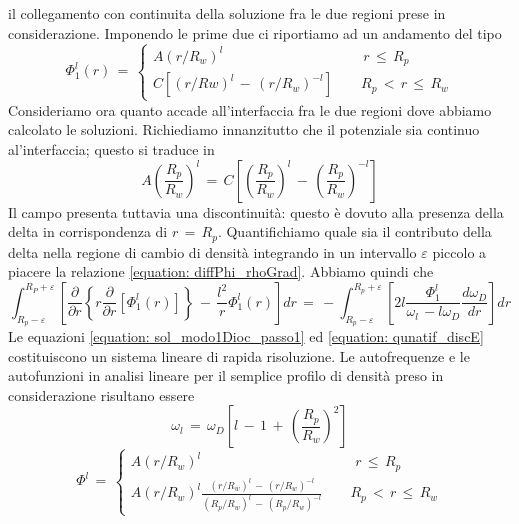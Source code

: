 il collegamento con continuita della soluzione fra le due regioni prese in considerazione. Imponendo le prime due ci riportiamo ad un
andamento del tipo
\begin{equation}
    \Phi_1^l\left(r\right)\,=\,
    \begin{cases}
        A\left(r/R_w\right)^l \qquad \qquad \qquad \qquad \qquad r\,\leq\,R_p\\
        C\left[\left(r/Rw\right)^l\,-\,\left(r/R_w\right)^{-l}\right] \qquad R_p\,<\,r\,\leq\,R_w
    \end{cases}
    \label{equation: sol_modo1Dioc_passo1}
\end{equation}
Consideriamo ora quanto accade all'interfaccia fra le due regioni dove abbiamo calcolato le soluzioni. Richiediamo innanzitutto che
il potenziale sia continuo al'interfaccia; questo si traduce in
\begin{equation}
    A\left(\frac{R_p}{R_w}\right)^l\,=\,C\left[\left(\frac{R_p}{R_w}\right)^l\,-\,\left(\frac{R_p}{R_w}\right)^{-l}\right]
\end{equation}
Il campo presenta tuttavia una discontinuità: questo è dovuto alla presenza della delta in corrispondenza di $r\,=\,R_p$. Quantifichiamo 
quale sia il contributo della delta nella regione di cambio di densità integrando in un intervallo $\varepsilon$ piccolo a piacere la
relazione \eqref{equation: diffPhi_rhoGrad}. Abbiamo quindi che 
\begin{equation}
    \int_{R_p-\varepsilon}^{R_P+\varepsilon} \left[    \frac{\partial}{\partial r}\left\{r\frac{\partial}{\partial r}\left[\Phi^l_1\left(r\right)\right]\right\}\,-\,\frac{l^2}{r}\Phi_1^l\left(r\right)\right] dr\,=\,-\int_{R_p-\varepsilon}^{R_p+\varepsilon} \left[2l\frac{\Phi_1^l}{\omega_l\,-l\omega_D}\frac{d\omega_D}{dr}\right] dr
    \label{equation: qunatif_discE}
\end{equation}
Le equazioni \eqref{equation: sol_modo1Dioc_passo1} ed \eqref{equation: qunatif_discE} costituiscono un sistema lineare di rapida 
risoluzione. Le autofrequenze e le autofunzioni in analisi lineare per il semplice profilo di densità preso in considerazione 
risultano essere
\begin{equation}
    \omega_l\,=\,\omega_D\left[l\,-\,1\,+\,\left(\frac{R_p}{R_w}\right)^2\right]
    \label{equation: autoFreq_lineare}
\end{equation}
\begin{equation}
    \Phi^l\,=\,
    \begin{cases}
        A\left(r/R_w\right)^l  \qquad \qquad \qquad \qquad \qquad \quad r\,\leq\,R_p \\
        A\left(r/R_w\right)^l \frac{\left(r/R_w\right)^l\,-\,\left(r/R_w\right)^{-l}}{\left(R_p/R_w\right)^l\,-\,\left(R_p/R_w\right)^{-l}} \qquad  R_p\,<\,r\,\leq\,R_w
    \end{cases}
    \label{equation: autoFunc_lineare}
\end{equation}

